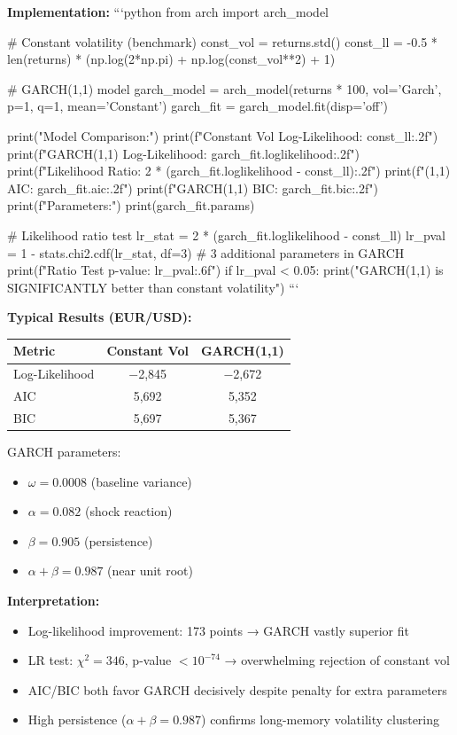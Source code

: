 \textbf{Implementation:}
```python
from arch import arch_model

# Constant volatility (benchmark)
const_vol = returns.std()
const_ll = -0.5 * len(returns) * (np.log(2*np.pi) + np.log(const_vol**2) + 1)

# GARCH(1,1) model
garch_model = arch_model(returns * 100, vol='Garch', p=1, q=1, mean='Constant')
garch_fit = garch_model.fit(disp='off')

print("Model Comparison:")
print(f"Constant Vol Log-Likelihood: {const_ll:.2f}")
print(f"GARCH(1,1) Log-Likelihood: {garch_fit.loglikelihood:.2f}")
print(f"Likelihood Ratio: {2 * (garch_fit.loglikelihood - const_ll):.2f}")
print(f"\nGARCH(1,1) AIC: {garch_fit.aic:.2f}")
print(f"GARCH(1,1) BIC: {garch_fit.bic:.2f}")
print(f"\nGARCH Parameters:")
print(garch_fit.params)

# Likelihood ratio test
lr_stat = 2 * (garch_fit.loglikelihood - const_ll)
lr_pval = 1 - stats.chi2.cdf(lr_stat, df=3)  # 3 additional parameters in GARCH
print(f"\nLikelihood Ratio Test p-value: {lr_pval:.6f}")
if lr_pval < 0.05:
print("GARCH(1,1) is SIGNIFICANTLY better than constant volatility")
```

\textbf{Typical Results (EUR/USD):}

\begin{center}
	\begin{tabular}{|l|c|c|}
		\hline
		\textbf{Metric} & \textbf{Constant Vol} & \textbf{GARCH(1,1)} \\
		\hline
		Log-Likelihood & $-$2,845 & $-$2,672 \\
		AIC & 5,692 & 5,352 \\
		BIC & 5,697 & 5,367 \\
		\hline
	\end{tabular}
\end{center}

GARCH parameters:
\begin{itemize}
	\item $\omega = 0.0008$ (baseline variance)
	\item $\alpha = 0.082$ (shock reaction)
	\item $\beta = 0.905$ (persistence)
	\item $\alpha + \beta = 0.987$ (near unit root)
\end{itemize}

\textbf{Interpretation:} 
\begin{itemize}
	\item Log-likelihood improvement: 173 points → GARCH vastly superior fit
	\item LR test: $\chi^2 = 346$, p-value $< 10^{-74}$ → overwhelming rejection of constant vol
	\item AIC/BIC both favor GARCH decisively despite penalty for extra parameters
	\item High persistence ($\alpha + \beta = 0.987$) confirms long-memory volatility clustering
\end{itemize}

